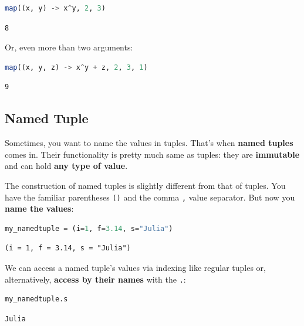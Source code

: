 \documentclass[
  notoc %
]{tufte-book}
\newcommand{\passthrough}[1]{#1}
\begin{document}
\begin{lstlisting}[language=Julia]
map((x, y) -> x^y, 2, 3)
\end{lstlisting}

\begin{lstlisting}[language=Output]
8
\end{lstlisting}

Or, even more than two arguments:

\begin{lstlisting}[language=Julia]
map((x, y, z) -> x^y + z, 2, 3, 1)
\end{lstlisting}

\begin{lstlisting}[language=Output]
9
\end{lstlisting}

\hypertarget{sec:namedtuple}{%
\subsection{Named Tuple}\label{sec:namedtuple}}

Sometimes, you want to name the values in tuples. That's when
\textbf{named tuples} comes in. Their functionality is pretty much same
as tuples: they are \textbf{immutable} and can hold \textbf{any type of
value}.

The construction of named tuples is slightly different from that of
tuples. You have the familiar parentheses \passthrough{\lstinline!()!}
and the comma \passthrough{\lstinline!,!} value separator. But now you
\textbf{name the values}:

\begin{lstlisting}[language=Julia]
my_namedtuple = (i=1, f=3.14, s="Julia")
\end{lstlisting}

\begin{lstlisting}[language=Output]
(i = 1, f = 3.14, s = "Julia")
\end{lstlisting}

We can access a named tuple's values via indexing like regular tuples
or, alternatively, \textbf{access by their names} with the
\passthrough{\lstinline!.!}:

\begin{lstlisting}[language=Julia]
my_namedtuple.s
\end{lstlisting}

\begin{lstlisting}[language=Output]
Julia
\end{lstlisting}
\end{document}
